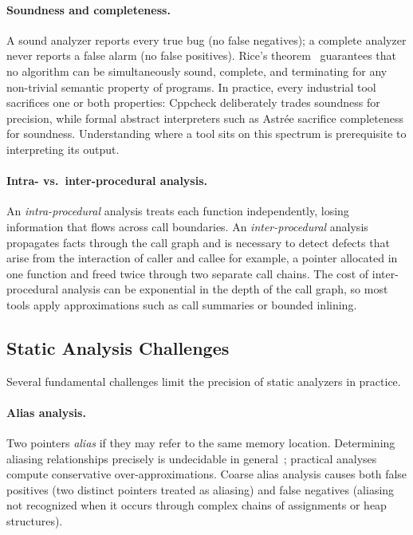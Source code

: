\documentclass[11pt,a4paper]{article}
\begin{document}
\paragraph{Soundness and completeness.} A sound analyzer reports every true bug (no false negatives); a complete analyzer never reports a false alarm (no false positives). Rice's theorem~\cite{rice1953} guarantees that no algorithm can be simultaneously sound, complete, and terminating for any non-trivial semantic property of programs. In practice, every industrial tool sacrifices one or both properties: Cppcheck deliberately trades soundness for precision, while formal abstract interpreters such as Astr\'{e}e sacrifice completeness for soundness. Understanding where a tool sits on this spectrum is prerequisite to interpreting its output.

\paragraph{Intra- vs.\ inter-procedural analysis.} An \emph{intra-procedural} analysis treats each function independently, losing information that flows across call boundaries. An \emph{inter-procedural} analysis propagates facts through the call graph and is necessary to detect defects that arise from the interaction of caller and callee for example, a pointer allocated in one function and freed twice through two separate call chains. The cost of inter-procedural analysis can be exponential in the depth of the call graph, so most tools apply approximations such as call summaries or bounded inlining.

\subsection{Static Analysis Challenges}

Several fundamental challenges limit the precision of static analyzers in practice.

\paragraph{Alias analysis.} Two pointers \emph{alias} if they may refer to the same memory location. Determining aliasing relationships precisely is undecidable in general~\cite{landi1992}; practical analyses compute conservative over-approximations. Coarse alias analysis causes both false positives (two distinct pointers treated as aliasing) and false negatives (aliasing not recognized when it occurs through complex chains of assignments or heap structures).
\end{document}
